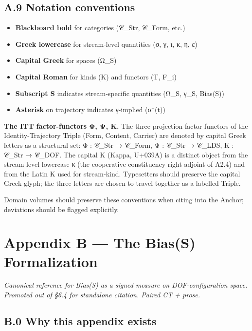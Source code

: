 \documentclass[11pt, openany]{book}
\newcommand{\sectionbreak}{\clearpage}
\begin{document}
\sectionbreak

\section{A.9 Notation conventions}

\begin{itemize}
\item \textbf{Blackboard bold} for categories (𝒞\_\allowbreak{}Str, 𝒞\_\allowbreak{}Form, etc.)
\item \textbf{Greek lowercase} for stream-level quantities (σ, γ, ι, κ, η, ε)
\item \textbf{Capital Greek} for spaces (Ω\_\allowbreak{}S)
\item \textbf{Capital Roman} for kinds (K) and functors (T, F\_\allowbreak{}i)
\item \textbf{Subscript S} indicates stream-specific quantities (Ω\_\allowbreak{}S, γ\_\allowbreak{}S, Bias(S))
\item \textbf{Asterisk} on trajectory indicates γ-implied (σ*(t))
\end{itemize}

\textbf{The ITT factor-functors Φ, Ψ, Κ.} The three projection factor-functors of the Identity-Trajectory Triple (Form, Content, Carrier) are denoted by capital Greek letters as a structural set: Φ : 𝒞\_\allowbreak{}Str → 𝒞\_\allowbreak{}Form, Ψ : 𝒞\_\allowbreak{}Str → 𝒞\_\allowbreak{}LDS, Κ : 𝒞\_\allowbreak{}Str → 𝒞\_\allowbreak{}DOF. The capital Κ (Kappa, U+039A) is a distinct object from the stream-level lowercase κ (the cooperative-constituency right adjoint of A2.4) and from the Latin K used for stream-kind. Typesetters should preserve the capital Greek glyph; the three letters are chosen to travel together as a labelled Triple.

Domain volumes should preserve these conventions when citing into the Anchor; deviations should be flagged explicitly.

\chapter{Appendix B — The Bias(S) Formalization}


\textit{Canonical reference for Bias(S) as a signed measure on DOF-configuration space. Promoted out of §6.4 for standalone citation. Paired CT + prose.}

\sectionbreak

\section{B.0 Why this appendix exists}
\end{document}
